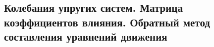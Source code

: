 

\subsection{Колебания упругих систем. Матрица коэффициентов влияния. Обратный метод составления уравнений движения}



